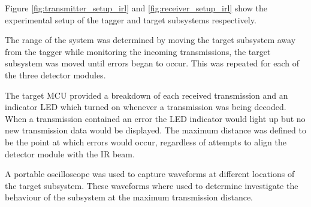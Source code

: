 Figure \ref{fig:transmitter_setup_irl} and \ref{fig:receiver_setup_irl} show the experimental setup of the tagger and target subsystems respectively.

The range of the system was determined by moving the target subsystem away from the tagger while monitoring the incoming transmissions, the target subsystem was moved until errors began to occur. This was repeated for each of the three detector modules.

The target MCU provided a breakdown of each received transmission and an indicator LED which turned on whenever a transmission was being decoded. When a transmission contained an error the LED indicator would light up but no new transmission data would be displayed. The maximum distance was defined to be the point at which errors would occur, regardless of attempts to align the detector module with the IR beam.

A portable oscilloscope was used to capture waveforms at different locations of the target subsystem. These waveforms where used to determine investigate the behaviour of the subsystem at the maximum transmission distance.



